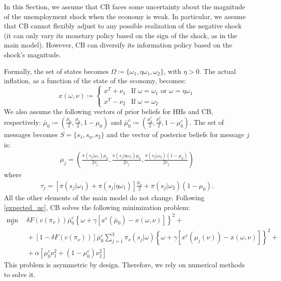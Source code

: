 \documentclass[12pt,a4paper]{article}
\begin{document}
In this Section, we assume that CB faces some uncertainty about the magnitude of the unemployment shock when the economy is weak. In particular, we assume that CB cannot flexibly adjust to any possible realization of the negative shock (it can only vary its monetary policy based on the sign of the shock, as in the main model). However, CB can diversify its information policy based on the shock's magnitude.

Formally, the set of states becomes $\Omega \coloneqq \{\omega_1, \eta\omega_1,\omega_2\}$, with $\eta>0$.
The actual inflation, as a function of the state of the economy, becomes: 
\begin{equation}
    x(\omega,\nu)\coloneqq\left\{
    \begin{array}{cc}
      x^T+\nu_1&  \mbox{If } \omega=\omega_1 \mbox{ or } \omega=\eta\omega_1\\
      x^T-\nu_2   &  \mbox{If } \omega=\omega_2
    \end{array}
    \right.
\end{equation}
We also assume the following vectors of prior beliefs for HHs and CB, respectively: $\bar{\mu}_0\coloneqq\left(\frac{\mu_0}{2},\frac{\mu_0}{2},1-\mu_0\right)$ and $\bar{\mu}_0^c\coloneqq\left(\frac{\mu_0^c}{2},\frac{\mu_0^c}{2},1-\mu_0^c\right)$. The set of messages becomes $S=\{s_1,s_\eta,s_2\}$ and the vector of posterior beliefs for message $j$ is:
\begin{align}
    \mu_j = \left(\frac{\pi(s_j|\omega_1)\mu_0}{2\tau_j}, \frac{\pi(s_j|\eta\omega_1)\mu_0}{2\tau_j}, \frac{\pi(s_j|\omega_2)(1-\mu_0)}{2\tau_j}\right)
\end{align}
where
\begin{align}
    \tau_j = [\pi(s_j|\omega_1)+\pi(s_j|\eta\omega_1)]\frac{\mu_0}{2} + \pi(s_j|\omega_2)(1-\mu_0).
\end{align}
All the other elements of the main model do not change. Following \eqref{expected_uc}, CB solves the following minimization problem:
\begin{equation}
    \begin{split}
    \min_{\nu} \ & \ \delta F(c(\pi_\nu))\bar{\mu}_0^c\left\{\omega+\gamma\left[x^e(\bar{\mu}_0)-x(\omega,\nu)\right]\right\}^2+\\
    \ & \ +[1-\delta F(c(\pi_\nu))]\bar{\mu}_0^c\sum_{j=1}^{3}\pi_\nu(s_j|\omega)\left\{\omega+\gamma\left[x^e(\mu_j(\nu))-x(\omega,\nu)\right]\right\}^2+\\
    \ & \ +\alpha [\mu_0^c\nu_1^2+(1-\mu_0^c)\nu_2^2]
    \end{split}
\end{equation}
This problem is asymmetric by design. Therefore, we rely on numerical methods to solve it.
\end{document}
